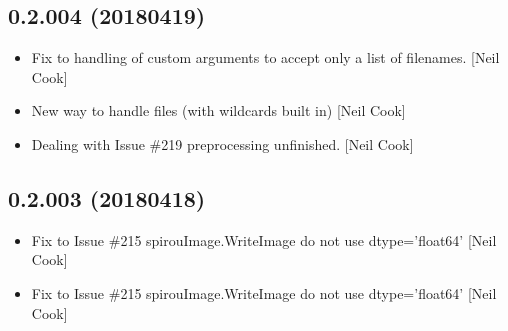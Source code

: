 \documentclass[a4paper,10pt,english]{report}
\begin{document}
\subsection{0.2.004 (2018\sphinxhyphen{}04\sphinxhyphen{}19)}
\label{\detokenize{misc/changelog:id476}}\begin{itemize}
\item {} 
Fix to handling of custom arguments to accept only a list of
filenames. {[}Neil Cook{]}

\item {} 
New way to handle files (with wildcards built in) {[}Neil Cook{]}

\item {} 
Dealing with Issue \#219 \sphinxhyphen{} pre\sphinxhyphen{}processing \sphinxhyphen{} unfinished. {[}Neil Cook{]}

\end{itemize}


\subsection{0.2.003 (2018\sphinxhyphen{}04\sphinxhyphen{}18)}
\label{\detokenize{misc/changelog:id477}}\begin{itemize}
\item {} 
Fix to Issue \#215 \sphinxhyphen{} spirouImage.WriteImage do not use dtype=’float64’
{[}Neil Cook{]}

\item {} 
Fix to Issue \#215 \sphinxhyphen{} spirouImage.WriteImage do not use dtype=’float64’
{[}Neil Cook{]}

\end{itemize}
\end{document}
